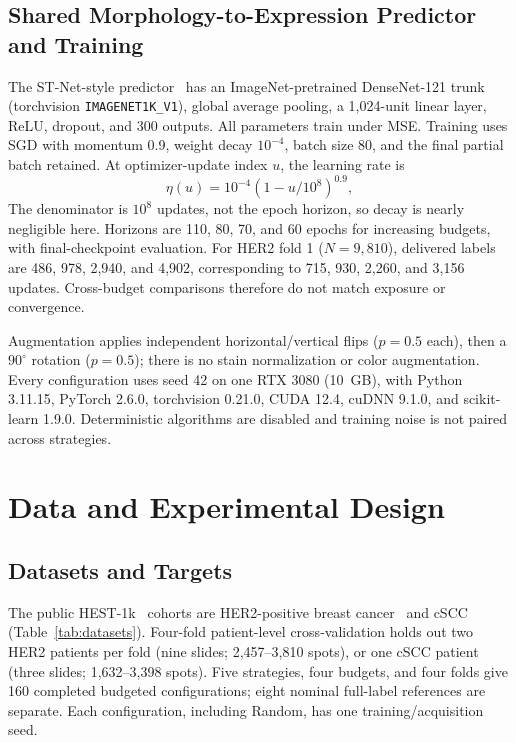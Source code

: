 \subsection{Shared Morphology-to-Expression Predictor and Training}
\label{sec:predictor}

The ST-Net-style predictor~\cite{he2020integrating} has an ImageNet-pretrained DenseNet-121 trunk~\cite{huang2017densely} (torchvision \texttt{IMAGENET1K\_V1}), global average pooling, a 1,024-unit linear layer, ReLU, dropout, and 300 outputs. All parameters train under MSE. Training uses SGD with momentum 0.9, weight decay $10^{-4}$, batch size 80, and the final partial batch retained. At optimizer-update index $u$, the learning rate is
\begin{equation}
\eta(u)=10^{-4}(1-u/10^8)^{0.9},
\label{eq:lr}
\end{equation}
The denominator is $10^8$ updates, not the epoch horizon, so decay is nearly negligible here. Horizons are 110, 80, 70, and 60 epochs for increasing budgets, with final-checkpoint evaluation. For HER2 fold 1 ($N=9{,}810$), delivered labels are 486, 978, 2,940, and 4,902, corresponding to 715, 930, 2,260, and 3,156 updates. Cross-budget comparisons therefore do not match exposure or convergence.

Augmentation applies independent horizontal/vertical flips ($p=0.5$ each), then a $90^\circ$ rotation ($p=0.5$); there is no stain normalization or color augmentation. Every configuration uses seed 42 on one RTX 3080 (10~GB), with Python 3.11.15, PyTorch 2.6.0, torchvision 0.21.0, CUDA 12.4, cuDNN 9.1.0, and scikit-learn 1.9.0. Deterministic algorithms are disabled and training noise is not paired across strategies.

\section{Data and Experimental Design}
\label{sec:data}
\subsection{Datasets and Targets}
\label{sec:setup}

The public HEST-1k~\cite{jaume2024hest} cohorts are HER2-positive breast cancer~\cite{andersson2021spatial} and cSCC~\cite{ji2020multimodal} (Table~\ref{tab:datasets}). Four-fold patient-level cross-validation holds out two HER2 patients per fold (nine slides; 2,457--3,810 spots), or one cSCC patient (three slides; 1,632--3,398 spots). Five strategies, four budgets, and four folds give 160 completed budgeted configurations; eight nominal full-label references are separate. Each configuration, including Random, has one training/acquisition seed.


